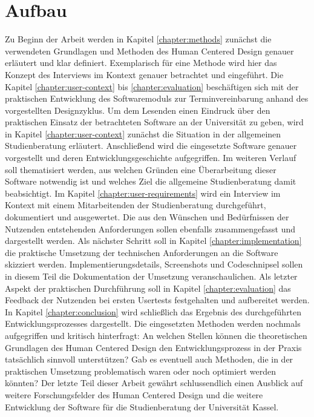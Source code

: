 \section{Aufbau}
Zu Beginn der Arbeit werden in Kapitel \ref{chapter:methods} zunächst die
verwendeten Grundlagen und Methoden des Human Centered Design genauer erläutert
und klar definiert. Exemplarisch für eine Methode wird hier das Konzept des
Interviews im Kontext genauer betrachtet und eingeführt. Die
Kapitel \ref{chapter:user-context} bis \ref{chapter:evaluation} beschäftigen sich
mit der praktischen Entwicklung des Softwaremoduls zur Terminvereinbarung
anhand des vorgestellten Designzyklus. Um dem Lesenden einen Eindruck über den
praktischen Einsatz der betrachteten Software an der Universität zu geben, wird
in Kapitel \ref{chapter:user-context} zunächst die Situation in der allgemeinen
Studienberatung erläutert. Anschließend wird die eingesetzte Software genauer
vorgestellt und deren Entwicklungsgeschichte aufgegriffen. Im weiteren Verlauf
soll thematisiert werden, aus welchen Gründen eine Überarbeitung dieser
Software notwendig ist und welches Ziel die allgemeine Studienberatung damit
beabsichtigt. Im Kapitel  \ref{chapter:user-requirements} wird ein Interview im
Kontext mit einem Mitarbeitenden der Studienberatung durchgeführt, dokumentiert
und ausgewertet. Die aus den Wünschen und Bedürfnissen der Nutzenden
entstehenden Anforderungen sollen ebenfalls zusammengefasst und dargestellt
werden. Als nächster Schritt soll in Kapitel \ref{chapter:implementation} die
praktische Umsetzung der technischen Anforderungen an die Software skizziert
werden. Implementierungsdetails, Screenshots und Codeschnipsel sollen in diesem
Teil die Dokumentation der Umsetzung veranschaulichen. Als letzter Aspekt der
praktischen Durchführung soll in Kapitel \ref{chapter:evaluation} das Feedback
der Nutzenden bei ersten \glspl{Usertest} festgehalten und aufbereitet werden. In
Kapitel \ref{chapter:conclusion} wird schließlich das Ergebnis des
durchgeführten Entwicklungsprozesses dargestellt. Die eingesetzten Methoden
werden nochmals aufgegriffen und kritisch hinterfragt: An welchen Stellen
können die theoretischen Grundlagen des Human Centered Design den
Entwicklungsprozess in der Praxis tatsächlich sinnvoll unterstützen? Gab es
eventuell auch Methoden, die in der praktischen Umsetzung problematisch waren
oder noch optimiert werden könnten? Der letzte Teil dieser Arbeit gewährt
schlussendlich einen Ausblick auf weitere Forschungsfelder des Human Centered
Design und die weitere Entwicklung der Software für die Studienberatung der
Universität Kassel.
